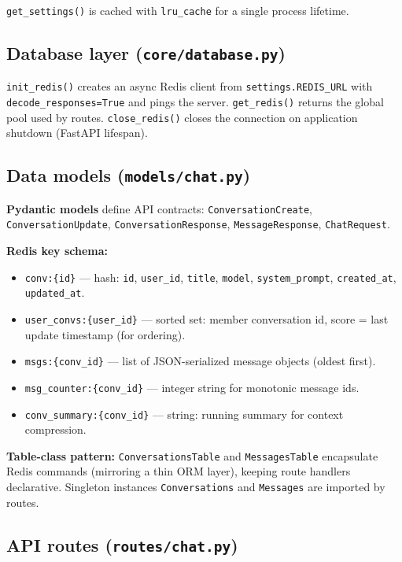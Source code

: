 \documentclass[11pt,a4paper]{article}
\begin{document}
\texttt{get\_settings()} is cached with \texttt{lru\_cache} for a single process lifetime.

\subsection{Database layer (\texttt{core/database.py})}

\texttt{init\_redis()} creates an async Redis client from \texttt{settings.REDIS\_URL} with \texttt{decode\_responses=True} and pings the server. \texttt{get\_redis()} returns the global pool used by routes. \texttt{close\_redis()} closes the connection on application shutdown (FastAPI lifespan).

\subsection{Data models (\texttt{models/chat.py})}

\textbf{Pydantic models} define API contracts: \texttt{ConversationCreate}, \texttt{ConversationUpdate}, \texttt{ConversationResponse}, \texttt{MessageResponse}, \texttt{ChatRequest}.

\textbf{Redis key schema:}
\begin{itemize}[noitemsep]
  \item \texttt{conv:\{id\}} --- hash: \texttt{id}, \texttt{user\_id}, \texttt{title}, \texttt{model}, \texttt{system\_prompt}, \texttt{created\_at}, \texttt{updated\_at}.
  \item \texttt{user\_convs:\{user\_id\}} --- sorted set: member conversation id, score = last update timestamp (for ordering).
  \item \texttt{msgs:\{conv\_id\}} --- list of JSON-serialized message objects (oldest first).
  \item \texttt{msg\_counter:\{conv\_id\}} --- integer string for monotonic message ids.
  \item \texttt{conv\_summary:\{conv\_id\}} --- string: running summary for context compression.
\end{itemize}

\textbf{Table-class pattern:} \texttt{ConversationsTable} and \texttt{MessagesTable} encapsulate Redis commands (mirroring a thin ORM layer), keeping route handlers declarative. Singleton instances \texttt{Conversations} and \texttt{Messages} are imported by routes.

\subsection{API routes (\texttt{routes/chat.py})}
\end{document}
